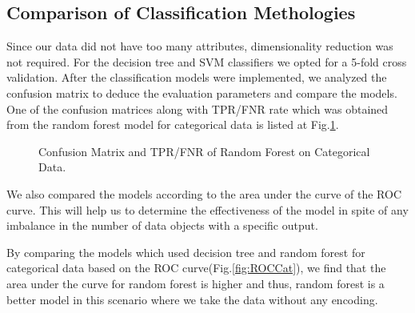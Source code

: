 \documentclass{article} %
\begin{document}
	\subsection{Comparison of Classification Methologies}
	Since our data did not have too many attributes, dimensionality reduction was not required. For the decision tree and SVM classifiers we opted for a 5-fold cross validation.
	After the classification models were implemented, we analyzed the confusion matrix to deduce the evaluation parameters and compare the models. One of the confusion matrices along with TPR/FNR rate which was obtained from the random forest model for categorical data is listed at Fig.\ref{fig:RFCM}. 
	
	\begin{figure}[h]
		\begin{center}
		\end{center}
		\caption{Confusion Matrix and TPR/FNR of Random Forest on Categorical Data.}
		\label{fig:RFCM}
	\end{figure}
	
	
	We also compared the models according to the area under the curve of the ROC curve. This will help us to determine the effectiveness of the model in spite of any imbalance in the number of data objects with a specific output.
	
	By comparing the models which used decision tree and random forest for categorical data based on the ROC curve(Fig.\ref{fig:ROCCat}), we find that the area under the curve for random forest is higher and thus, random forest is a better model in this scenario where we take the data without any encoding.
	
\end{document}
